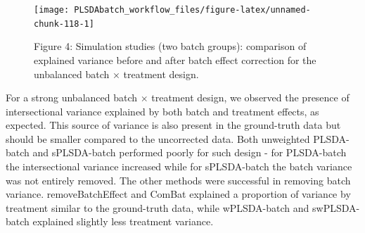 \documentclass[
]{book}
\begin{document}
\begin{figure}

{\centering \texttt{[image: PLSDAbatch\_workflow\_files/figure-latex/unnamed-chunk-118-1]} 

}

\caption{Figure 4: Simulation studies (two batch groups): comparison of explained variance before and after batch effect correction for the unbalanced batch × treatment design.}\label{fig:unnamed-chunk-118}
\end{figure}

For a strong unbalanced batch \(\times\) treatment design, we observed the presence of intersectional variance explained by both batch and treatment effects, as expected. This source of variance is also present in the ground-truth data but should be smaller compared to the uncorrected data. Both unweighted PLSDA-batch and sPLSDA-batch performed poorly for such design - for PLSDA-batch the intersectional variance increased while for sPLSDA-batch the batch variance was not entirely removed. The other methods were successful in removing batch variance. removeBatchEffect and ComBat explained a proportion of variance by treatment similar to the ground-truth data, while wPLSDA-batch and swPLSDA-batch explained slightly less treatment variance.
\end{document}
